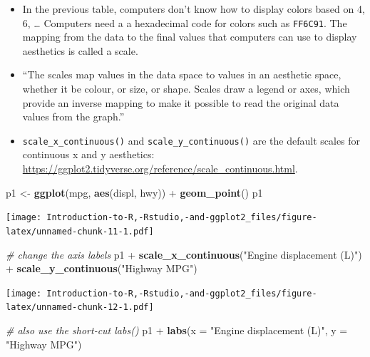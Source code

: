 \documentclass[]{book}
\newenvironment{Shaded}{\begin{snugshade}}{\end{snugshade}}
\newcommand{\KeywordTok}[1]{\textcolor[rgb]{0.13,0.29,0.53}{\textbf{{#1}}}}
\newcommand{\DataTypeTok}[1]{\textcolor[rgb]{0.13,0.29,0.53}{{#1}}}
\newcommand{\StringTok}[1]{\textcolor[rgb]{0.31,0.60,0.02}{{#1}}}
\newcommand{\CommentTok}[1]{\textcolor[rgb]{0.56,0.35,0.01}{\textit{{#1}}}}
\newcommand{\NormalTok}[1]{{#1}}
\begin{document}
\begin{itemize}
\item
  In the previous table, computers don't know how to display colors
  based on 4, 6, \ldots{} Computers need a a hexadecimal code for colors
  such as \texttt{FF6C91}. The mapping from the data to the final values
  that computers can use to display aesthetics is called a scale.
\item
  ``The scales map values in the data space to values in an aesthetic
  space, whether it be colour, or size, or shape. Scales draw a legend
  or axes, which provide an inverse mapping to make it possible to read
  the original data values from the graph.'' \citep{ggplot2}
\item
  \texttt{scale\_x\_continuous()} and \texttt{scale\_y\_continuous()}
  are the default scales for continuous x and y aesthetics:
  \url{https://ggplot2.tidyverse.org/reference/scale_continuous.html}.
\end{itemize}

\begin{Shaded}
\begin{Highlighting}[]
\NormalTok{p1 <-}\StringTok{ }\KeywordTok{ggplot}\NormalTok{(mpg, }\KeywordTok{aes}\NormalTok{(displ, hwy)) +}\StringTok{ }\KeywordTok{geom_point}\NormalTok{()}
\NormalTok{p1}
\end{Highlighting}
\end{Shaded}

\texttt{[image: Introduction-to-R,-Rstudio,-and-ggplot2\_files/figure-latex/unnamed-chunk-11-1.pdf]}

\begin{Shaded}
\begin{Highlighting}[]
\CommentTok{# change the axis labels}
\NormalTok{p1 +}\StringTok{ }\KeywordTok{scale_x_continuous}\NormalTok{(}\StringTok{"Engine displacement (L)"}\NormalTok{) +}
\StringTok{  }\KeywordTok{scale_y_continuous}\NormalTok{(}\StringTok{"Highway MPG"}\NormalTok{)}
\end{Highlighting}
\end{Shaded}

\texttt{[image: Introduction-to-R,-Rstudio,-and-ggplot2\_files/figure-latex/unnamed-chunk-12-1.pdf]}

\begin{Shaded}
\begin{Highlighting}[]
\CommentTok{# also use the short-cut labs()}
\NormalTok{p1 +}\StringTok{ }\KeywordTok{labs}\NormalTok{(}\DataTypeTok{x =} \StringTok{"Engine displacement (L)"}\NormalTok{, }\DataTypeTok{y =} \StringTok{"Highway MPG"}\NormalTok{)}
\end{Highlighting}
\end{Shaded}
\end{document}
